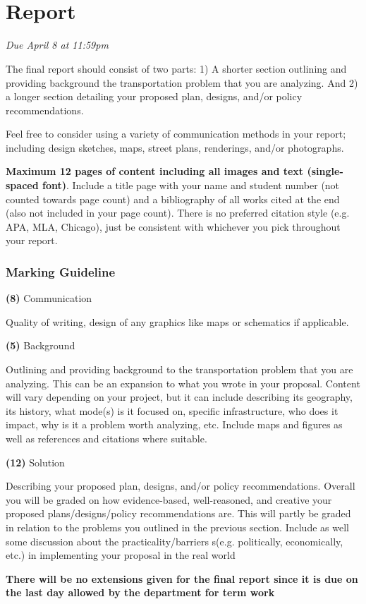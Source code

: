 \documentclass[11pt]{article}
\begin{document}
	\newpage
	
	
	\section*{\\Report}
	
	\textit{Due April 8 at 11:59pm}
	
	The final report should consist of two parts: 1) A shorter section outlining and providing background the transportation problem that you are analyzing. And 2) a longer section detailing your proposed plan, designs, and/or policy recommendations.
	
	Feel free to consider using a variety of communication methods in your report; including design sketches, maps, street plans, renderings, and/or photographs.
	
	\textbf{Maximum 12 pages of content including all images and text (single-spaced font)}. Include a title page with your name and student number (not counted towards page count) and a bibliography of all works cited at the end (also not included in your page count). There is no preferred citation style (e.g. APA, MLA, Chicago), just be consistent with whichever you pick throughout your report. 
	
	

	\subsubsection*{Marking Guideline}
	
	\textbf{(8)} Communication 
	
	Quality of writing, design of any graphics like maps or schematics if applicable.
	
	\textbf{(5)} Background 
	
	Outlining and providing background to the transportation problem that you are analyzing. This can be an expansion to what you wrote in your proposal. Content will vary depending on your project, but it can include describing its geography, its history, what mode(s) is it focused on, specific infrastructure, who does it impact, why is it a problem worth analyzing, etc. Include maps and figures as well as references and citations where suitable.
	
	\textbf{(12)} Solution 
	
	Describing your proposed plan, designs, and/or policy recommendations. Overall you will be graded on how evidence-based, well-reasoned, and creative your proposed plans/designs/policy recommendations are. This will partly be graded in relation to the problems you outlined in the previous section. Include as well some discussion about the practicality/barriers s(e.g. politically, economically, etc.) in implementing your proposal in the real world
	
	\vspace{3mm}
	
	\textbf{There will be no extensions given for the final report since it is due on the last day allowed by the department for term work}
	
	
\end{document}
